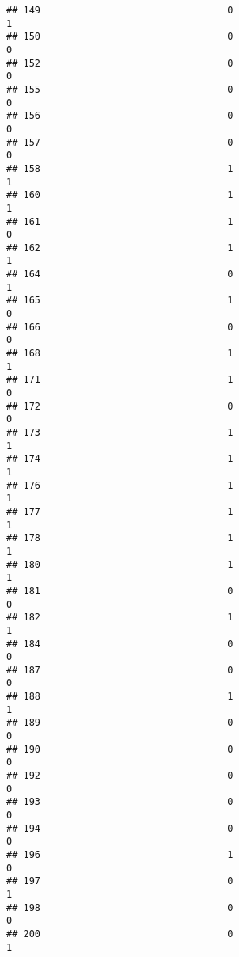 \documentclass[
]{article}
\begin{document}
\begin{verbatim}
## 149                                 0                                1
## 150                                 0                                0
## 152                                 0                                0
## 155                                 0                                0
## 156                                 0                                0
## 157                                 0                                0
## 158                                 1                                1
## 160                                 1                                1
## 161                                 1                                0
## 162                                 1                                1
## 164                                 0                                1
## 165                                 1                                0
## 166                                 0                                0
## 168                                 1                                1
## 171                                 1                                0
## 172                                 0                                0
## 173                                 1                                1
## 174                                 1                                1
## 176                                 1                                1
## 177                                 1                                1
## 178                                 1                                1
## 180                                 1                                1
## 181                                 0                                0
## 182                                 1                                1
## 184                                 0                                0
## 187                                 0                                0
## 188                                 1                                1
## 189                                 0                                0
## 190                                 0                                0
## 192                                 0                                0
## 193                                 0                                0
## 194                                 0                                0
## 196                                 1                                0
## 197                                 0                                1
## 198                                 0                                0
## 200                                 0                                1

\end{verbatim}
\end{document}
